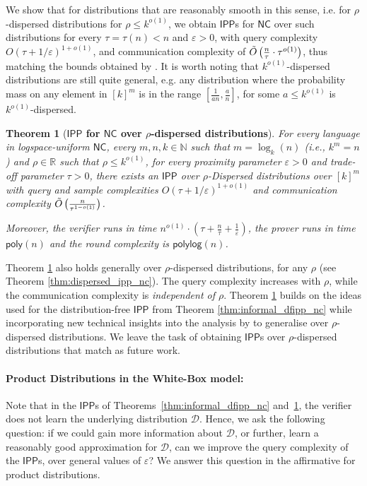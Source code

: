 \documentclass[10pt,a4paper]{article}
\newtheorem{theorem}{Theorem}[section]
\newcommand{\poly}{\mathsf{poly}}
\newcommand{\polylog}{\mathsf{polylog}}
\newcommand{\NC}{\mathsf{NC}}
\newcommand{\IPP}{\mathsf{IPP}}
\newcommand{\N}{\mathbb{N}}
\newcommand{\R}{\mathbb{R}}
\newcommand{\sD}{\mathcal{D}}
\newcommand{\eps}{\varepsilon}
\begin{document}
We show that for distributions that are reasonably smooth in this sense, i.e. for $\rho$-dispersed distributions for $\rho \leq k^{o(1)}$, we obtain  $\IPP$s for $\NC$ over such distributions for every $\tau=\tau(n)<n$ and $\varepsilon > 0$, with query complexity $O(\tau + 1/\eps)^{1+o(1)}$, and communication complexity of $\Tilde{O}\left(\frac{n}{\tau}\cdot \tau^{o(1)}\right)$, thus matching the bounds obtained by \cite{RVW}. It is worth noting that $k^{o(1)}$-dispersed distributions are still quite general, e.g. any distribution where the probability mass on any element in $[k]^m$ is in the range $\left[\frac{1}{an}, \frac{a}{n}\right]$, for some $a \leq k^{o(1)}$ is $k^{o(1)}$-dispersed. 

\begin{theorem}[\textbf{$\IPP$ for $\NC$ over $\rho$-dispersed distributions}]
    \label{thm:informal_ipp_dispersed}
    For every language in logspace-uniform $\NC$, every $m,n,k \in \N$ such that $m = \log_k(n)$ (i.e., $k^m = n$) and $\rho \in \R$ such that $\rho \leq k^{o(1)}$, for every proximity parameter $\eps > 0$ and trade-off parameter $\tau>0$,  there exists an $\IPP$ over $\rho$-Dispersed distributions over $[k]^m$ with query and sample complexities $O(\tau+ 1/\eps)^{1+o(1)}$ and communication complexity $\Tilde{O} \left( \frac{n}{\tau^{1-o(1)}}\right)$. 
    
    Moreover, the verifier runs in time $n^{o(1)} \cdot \left(\tau + \frac{n}{\tau} +\frac{1}{\eps}\right)$, the prover runs in time $\poly(n)$ and the round complexity is $\polylog(n)$.
\end{theorem}

Theorem \ref{thm:informal_ipp_dispersed} also holds generally over $\rho$-dispersed distributions, for any $\rho$ (see Theorem \ref{thm:dispersed_ipp_nc}). The query complexity increases with $\rho$, while the communication complexity is \textit{independent of $\rho$}. Theorem \ref{thm:informal_ipp_dispersed} builds on the ideas used for the distribution-free $\IPP$ from Theorem \ref{thm:informal_dfipp_nc} while incorporating new technical insights into the analysis by \cite{RVW} to generalise over $\rho$-dispersed distributions. We leave the task of obtaining $\IPP$s over $\rho$-dispersed distributions that match \cite{RR20_batch_polylog} as future work.

\paragraph{Product Distributions in the White-Box model:}
Note that in the $\IPP$s of Theorems~\ref{thm:informal_dfipp_nc} and~\ref{thm:informal_ipp_dispersed}, the verifier does not learn the underlying distribution $\sD$. Hence, we ask the following question: if we could gain more information about $\sD$, or further, learn a reasonably good approximation for $\sD$, can we improve the query complexity of the $\IPP$s, over general values of $\varepsilon$? We answer this question in the affirmative for product distributions.
\end{document}

